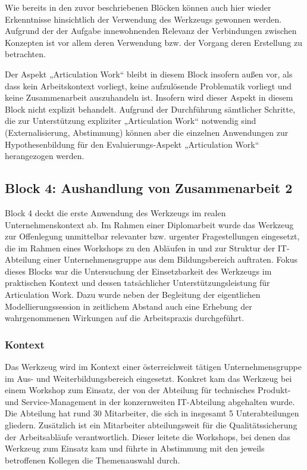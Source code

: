 Wie bereits in den zuvor beschriebenen Blöcken können auch hier wieder Erkenntnisse hinsichtlich der Verwendung des Werkzeugs gewonnen werden. Aufgrund der der Aufgabe innewohnenden Relevanz der Verbindungen zwischen Konzepten ist vor allem deren Verwendung bzw. der Vorgang deren Erstellung zu betrachten.

Der Aspekt „Articulation Work“ bleibt in diesem Block insofern außen vor, als dass kein Arbeitskontext vorliegt, keine aufzulösende Problematik vorliegt und keine Zusammenarbeit auszuhandeln ist. Insofern wird dieser Aspekt in diesem Block nicht explizit behandelt. Aufgrund der Durchführung sämtlicher Schritte, die zur Unterstützung expliziter „Articulation Work“ notwendig sind (Externalisierung, Abstimmung) können aber die einzelnen Anwendungen zur Hypothesenbildung für den Evaluierungs-Aspekt „Articulation Work“ herangezogen werden.


\subsection{Block 4: Aushandlung von Zusammenarbeit 2}
\label{sub:eval_4}

Block 4 deckt die erste Anwendung des Werkzeugs im realen Unternehmenskontext ab. Im Rahmen einer Diplomarbeit \citep{Wahlmuller10} wurde das Werkzeug zur Offenlegung unmittelbar relevanter bzw. urgenter Fragestellungen eingesetzt, die im Rahmen eines Workshops zu den Abläufen in und zur Struktur der IT-Abteilung einer Unternehmensgruppe aus dem Bildungsbereich auftraten. Fokus dieses Blocks war die Untersuchung der Einsetzbarkeit des Werkzeugs im praktischen Kontext und dessen tatsächlicher Unterstützungsleistung für Articulation Work. Dazu wurde neben der Begleitung der eigentlichen Modellierungssession in zeitlichem Abstand auch eine Erhebung der wahrgenommenen Wirkungen auf die Arbeitspraxis durchgeführt.

\subsubsection{Kontext} %
\label{ssub:4_kontext}

Das Werkzeug wird im Kontext einer österreichweit tätigen Unternehmensgruppe im Aus- und Weiterbildungsbereich eingesetzt. Konkret kam das Werkzeug bei einem Workshop zum Einsatz, der von der Abteilung für technisches Produkt- und Service-Management in der konzernweiten IT-Abteilung abgehalten wurde. Die Abteilung hat rund 30 Mitarbeiter, die sich in insgesamt 5 Unterabteilungen gliedern. Zusätzlich ist ein Mitarbeiter abteilungsweit für die Qualitätssicherung der Arbeitsabläufe verantwortlich. Dieser leitete die Workshops, bei denen das Werkzeug zum Einsatz kam und führte in Abstimmung mit den jeweils betroffenen Kollegen die Themenauswahl durch.


